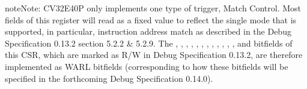 \documentclass[letterpaper,10pt,english]{sphinxmanual}
\begin{document}
\begin{sphinxadmonition}{note}{Note:}
\sphinxAtStartPar
CV32E40P only implements one type of trigger, Match Control. Most fields of this register will read as a fixed value to
reflect the single mode that is supported, in particular, instruction address match as described in the Debug Specification
0.13.2 section 5.2.2 \& 5.2.9. The , , , , , , , ,
, , , ,   and   bitfields of this CSR, which are marked as R/W in Debug Specification
0.13.2, are therefore implemented as WARL bitfields (corresponding to how these bitfields will be specified in the forthcoming
Debug Specification 0.14.0).
\end{sphinxadmonition}
\end{document}
